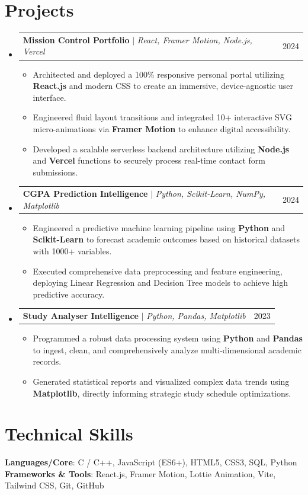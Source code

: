 \documentclass[letterpaper,11pt]{article}
\makeatletter
\newcommand{\resumeItem}[1]{
  \item\small{
    {#1 \vspace{-2pt}}
  }
}
\newcommand{\resumeProjectHeading}[2]{
    \item
    \begin{tabular*}{0.97\textwidth}{l@{\extracolsep{\fill}}r}
      \small#1 & #2 \\
    \end{tabular*}\vspace{-7pt}
}
\newcommand{\resumeSubHeadingListStart}{\begin{itemize}[leftmargin=0.15in, label={}]}
\newcommand{\resumeSubHeadingListEnd}{\end{itemize}}
\newcommand{\resumeItemListStart}{\begin{itemize}}
\newcommand{\resumeItemListEnd}{\end{itemize}\vspace{-5pt}}
\makeatother
\begin{document}
\section{Projects}
    \resumeSubHeadingListStart
      \resumeProjectHeading
          {\textbf{Mission Control Portfolio} $|$ \emph{React, Framer Motion, Node.js, Vercel}}{2024}
          \resumeItemListStart
            \resumeItem{Architected and deployed a 100\% responsive personal portal utilizing \textbf{React.js} and modern CSS to create an immersive, device-agnostic user interface.}
            \resumeItem{Engineered fluid layout transitions and integrated 10+ interactive SVG micro-animations via \textbf{Framer Motion} to enhance digital accessibility.}
            \resumeItem{Developed a scalable serverless backend architecture utilizing \textbf{Node.js} and \textbf{Vercel} functions to securely process real-time contact form submissions.}
          \resumeItemListEnd
      \resumeProjectHeading
          {\textbf{CGPA Prediction Intelligence} $|$ \emph{Python, Scikit-Learn, NumPy, Matplotlib}}{2024}
          \resumeItemListStart
            \resumeItem{Engineered a predictive machine learning pipeline using \textbf{Python} and \textbf{Scikit-Learn} to forecast academic outcomes based on historical datasets with 1000+ variables.}
            \resumeItem{Executed comprehensive data preprocessing and feature engineering, deploying Linear Regression and Decision Tree models to achieve high predictive accuracy.}
          \resumeItemListEnd
      \resumeProjectHeading
          {\textbf{Study Analyser Intelligence} $|$ \emph{Python, Pandas, Matplotlib}}{2023}
          \resumeItemListStart
            \resumeItem{Programmed a robust data processing system using \textbf{Python} and \textbf{Pandas} to ingest, clean, and comprehensively analyze multi-dimensional academic records.}
            \resumeItem{Generated statistical reports and visualized complex data trends using \textbf{Matplotlib}, directly informing strategic study schedule optimizations.}
          \resumeItemListEnd
    \resumeSubHeadingListEnd


\section{Technical Skills}
 \begin{itemize}[leftmargin=0.15in, label={}]
    \small{\item{
     \textbf{Languages/Core}{: C / C++, JavaScript (ES6+), HTML5, CSS3, SQL, Python} \\
     \textbf{Frameworks \& Tools}{: React.js, Framer Motion, Lottie Animation, Vite, Tailwind CSS, Git, GitHub} \\
    }}
 \end{itemize}
\end{document}
